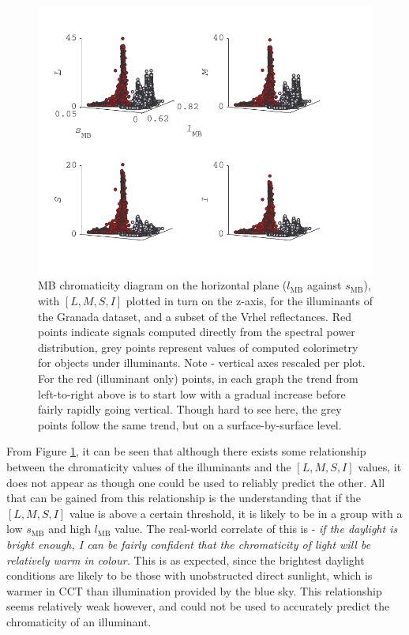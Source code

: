 \begin{figure}[htbp]
    \includegraphics[max width=\textwidth]{figs/comp/melcomp_1/level1sigspredictingColorimetry.pdf}
    \caption{\gls{MB} chromaticity diagram on the horizontal plane ($l_{\text{MB}}$ against $s_{\text{MB}}$), with $[L,M,S,I]$ plotted in turn on the z-axis, for the illuminants of the Granada dataset, and a subset of the Vrhel reflectances. Red points indicate signals computed directly from the spectral power distribution, grey points represent values of computed colorimetry for objects under illuminants. Note - vertical axes rescaled per plot. For the red (illuminant only) points, in each graph the trend from left-to-right above is to start low with a gradual increase before fairly rapidly going vertical. Though hard to see here, the grey points follow the same trend, but on a surface-by-surface level.}
    \label{fig:level1}
\end{figure} 

From Figure \ref{fig:level1}, it can be seen that although there exists some relationship between the chromaticity values of the illuminants and the $[L,M,S,I]$ values, it does not appear as though one could be used to reliably predict the other. All that can be gained from this relationship is the understanding that if the $[L,M,S,I]$ value is above a certain threshold, it is likely to be in a group with a low $s_{\text{MB}}$ and high $l_{\text{MB}}$ value. The real-world correlate of this is - \textit{if the daylight is bright enough, I can be fairly confident that the chromaticity of light will be relatively warm in colour.} This is as expected, since the brightest daylight conditions are likely to be those with unobstructed direct sunlight, which is warmer in \gls{CCT} than illumination provided by the blue sky. This relationship seems relatively weak however, and could not be used to accurately predict the chromaticity of an illuminant. 

